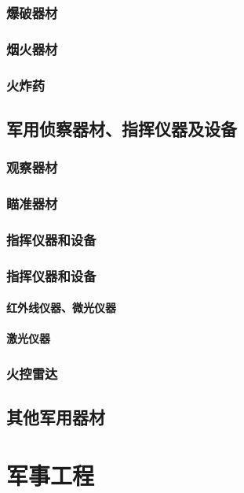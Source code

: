 \documentclass[UTF8]{../ApplicationUniverse}
\begin{document}
        \subsubsection{爆破器材}
        \subsubsection{烟火器材}
        \subsubsection{火炸药}

    \subsection{军用侦察器材、指挥仪器及设备}
        \subsubsection{观察器材}
        \subsubsection{瞄准器材}
        \subsubsection{指挥仪器和设备}
        \subsubsection{指挥仪器和设备}
            \paragraph{红外线仪器、微光仪器}
            \paragraph{激光仪器}
        \subsubsection{火控雷达}
    \subsection{其他军用器材}

\section{军事工程}
\end{document}
